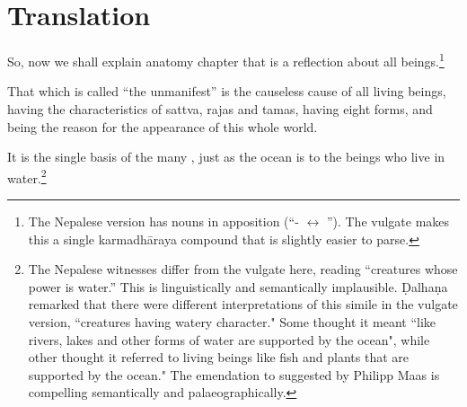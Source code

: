 \newpage

\section{Translation}

\begin{translation}
    
    \item [1] 
    
    So, now we shall explain anatomy chapter that is a reflection about all 
    beings.\footnote{The Nepalese version has nouns in apposition 
    (“- $\leftrightarrow$ ”).  The vulgate makes this a 
    single 
    karmadhāraya compound that is slightly easier to parse.} 
    
\item[3]


That which is called “the unmanifest” is the causeless cause of all living beings,  
having the characteristics of sattva, rajas and tamas, having eight forms, and 
being the reason for the appearance of this whole world.
    
It is the single basis of the many , just as the ocean is to the beings who live in
water.\footnote{The Nepalese witnesses differ from the vulgate here,
    reading  “creatures whose power is water.”  This is
    linguistically and semantically implausible. Ḍalhaṇa remarked that
    there were different interpretations of this simile in the vulgate
    version,  “creatures having watery character." Some
    thought it meant ``like rivers, lakes and other forms of water are
    supported by the ocean", while other thought it referred to living
    beings like fish and plants that are supported by the ocean." The
    emendation to  suggested by Philipp Maas is compelling
    semantically and palaeographically.}
    

\end{translation}
